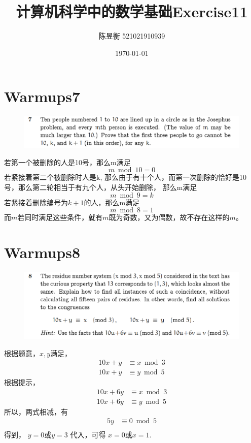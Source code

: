 \documentclass[]{article}
\title{计算机科学中的数学基础Exercise11}
\author{陈昱衡 521021910939}
\date{\today}
\begin{document}
\maketitle



\section*{Warmups7}
\begin{figure}[H]
	\includegraphics[scale=1]{Q1.png}
\end{figure}
若第一个被删除的人是10号，那么m满足
\begin{equation}
m \bmod 10  = 0
\end{equation}
若紧接着第二个被删除时人是k,
那么由于有十个人，而第一次删除的恰好是10号，那么第二轮相当于有九个人，从头开始删除，
那么m满足
\begin{equation}
	m \bmod 9 = k
\end{equation}
若紧接着删除编号为$k+1$的人，那么m满足
\begin{equation}
	m \bmod 8 = 1
\end{equation}
而$m$若同时满足这些条件，就有$m$既为奇数，又为偶数，故不存在这样的$m$。
\section*{Warmups8}
\begin{figure}[H]
	\includegraphics[scale=1]{Q2}
\end{figure}
根据题意，$x,y$满足，
\begin{align}
	10x+y &\equiv x \bmod 3\\
	10x+y &\equiv y \bmod 5
\end{align}
根据提示，
\begin{align}
	10x + 6y &\equiv x \bmod 3\\
	10x + 6y &\equiv y \bmod 5
\end{align}
所以，两式相减，有
\begin{align}
	5y&\equiv0 \bmod 5\\
\end{align}
得到， $y=0$或$y=3$
代入，可得
$x=0$或$x=1$.
\end{document}
